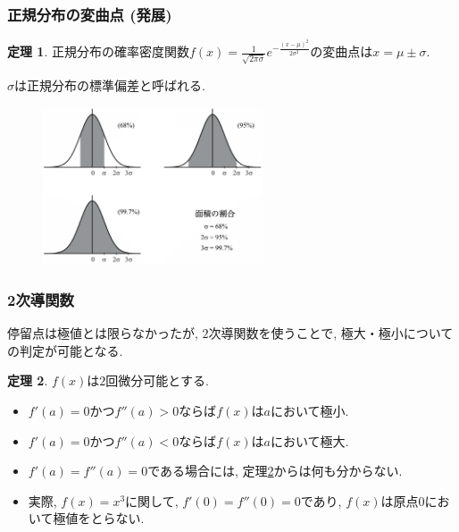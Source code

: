 \documentclass[dvipdfmx,cjk,10.2pt]{beamer}
\theoremstyle{definition}
\newtheorem{Thm}{定理}[section]
\begin{document}



\begin{frame}
\frametitle{正規分布の変曲点 (発展)}

\begin{Thm}
正規分布の確率密度関数$f(x)=\frac{1}{\sqrt{2 \pi \sigma}}e^{-\frac{(x-\mu)^2}{2\sigma^2}}$の変曲点は$x=\mu \pm \sigma$. 
\end{Thm}
$\sigma$は正規分布の標準偏差と呼ばれる. 


 \begin{figure}[htbp]
 \begin{center} 
  \includegraphics[width=65mm]{normal_sigma.png}
 \end{center}
\end{figure}

\end{frame}




\begin{frame}
\frametitle{2次導関数}

停留点は極値とは限らなかったが, $2$次導関数を使うことで, 極大・極小についての判定が可能となる. 


\begin{Thm} \label{2回微分と極値}
$f(x)$は$2$回微分可能とする. 
\begin{itemize}
\item $f'(a)=0$かつ$f''(a)>0$ならば$f(x)$は$a$において極小. 
\item $f'(a)=0$かつ$f''(a)<0$ならば$f(x)$は$a$において極大.  
\end{itemize}
\end{Thm}

\begin{itemize}
\item $f'(a)=f''(a)=0$である場合には, 定理\ref{2回微分と極値}からは何も分からない. 
\item 実際, $f(x)=x^3$に関して, $f'(0)=f''(0)=0$であり, $f(x)$は原点$0$において極値をとらない.  
\end{itemize}
\end{frame}
\end{document}
